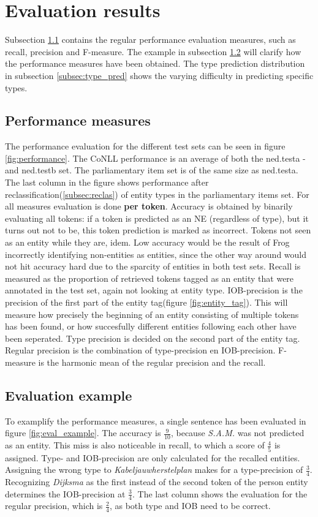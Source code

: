 \section{Evaluation results}
Subsection \ref{subsec:per_mes} contains the regular performance evaluation measures, such as recall, precision and F-measure. The example in subsection \ref{subsec:eval_example} will clarify how the performance measures have been obtained. The type prediction distribution in subsection \ref{subsec:type_pred} shows the varying difficulty in predicting specific types.

\label{sec:eva}
\subsection{Performance measures}\label{subsec:per_mes}
The performance evaluation for the different test sets can be seen in figure \ref{fig:performance}. The CoNLL performance is an average of both the ned.testa -and ned.testb set. The parliamentary item set is of the same size as ned.testa. The last column in the figure shows performance after reclassification(\ref{subsec:reclas}) of entity types in the parliamentary items set. For all measures evaluation is done \textbf{per token}. Accuracy is obtained by binarily evaluating all tokens: if a token is predicted as an NE (regardless of type), but it turns out not to be, this token prediction is marked as incorrect. Tokens not seen as an entity while they are, idem. Low accuracy would be the result of Frog incorrectly identifying non-entities as entities, since the other way around would not hit accuracy hard due to the sparcity of entities in both test sets. Recall is measured as the proportion of retrieved tokens tagged as an entity that were annotated in the test set, again not looking at entity type. IOB-precision is the precision of the first part of the entity tag(figure \ref{fig:entity_tag}). This will measure how precisely the beginning of an entity consisting of multiple tokens has been found, or how succesfully different entities following each other have been seperated. Type precision is decided on the second part of the entity tag.  Regular precision is the combination of type-precision en IOB-precision. F-measure is the harmonic mean of the regular precision and the recall.

\subsection{Evaluation example}\label{subsec:eval_example}
To examplify the performance measures, a single sentence has been evaluated in figure \ref{fig:eval_example}. The accuracy is $\frac{9}{10}$, because \textit{S.A.M.} was not predicted as an entity. This miss is also noticeable in recall, to which a score of $\frac{4}{5}$ is assigned. Type- and IOB-precision are only calculated for the recalled entities. Assigning the wrong type to \textit{Kabeljauwherstelplan} makes for a type-precision of $\frac{3}{4}$. Recognizing \textit{Dijksma} as the first instead of the second token of the person entity determines the IOB-precision at $\frac{3}{4}$. The last column shows the evaluation for the regular precision, which is $\frac{2}{4}$, as both type and IOB need to be correct.

